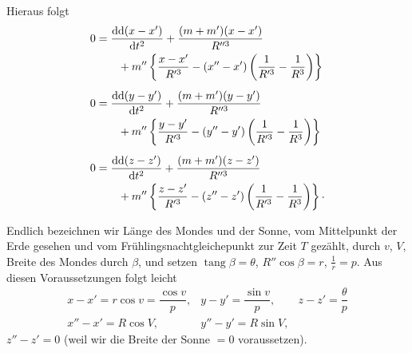 \clearpage
\begingroup
{}
\renewcommand{\headrulewidth}{0pt}
\par\noindent Hieraus folgt
\[
\begin{aligned}
0&=\frac{\mathrm{dd}(x-x')}{\mathrm{d}t^2}
  +\frac{(m+m')(x-x')}{R''^3}\\
 &\qquad+m''\left\{\frac{x-x'}{R'^3}
  -(x''-x')\left(\frac{1}{R'^3}-\frac{1}{R^3}\right)\right\}\\[5pt]
0&=\frac{\mathrm{dd}(y-y')}{\mathrm{d}t^2}
  +\frac{(m+m')(y-y')}{R''^3}\\
 &\qquad+m''\left\{\frac{y-y'}{R'^3}
  -(y''-y')\left(\frac{1}{R'^3}-\frac{1}{R^3}\right)\right\}\\[5pt]
0&=\frac{\mathrm{dd}(z-z')}{\mathrm{d}t^2}
  +\frac{(m+m')(z-z')}{R''^3}\\
 &\qquad+m''\left\{\frac{z-z'}{R'^3}
  -(z''-z')\left(\frac{1}{R'^3}-\frac{1}{R^3}\right)\right\}
  \mathpunct{\raisebox{.4ex}{.}}
\end{aligned}
\]

\par\noindent\hspace*{\parindent}Endlich bezeichnen wir Länge des Mondes und der Sonne, vom Mittelpunkt
der Erde gesehen und vom Frühlingsnachtgleichepunkt zur Zeit \(T\)
gezählt, durch \(v\), \(V\), Breite des Mondes durch \(\beta\), und setzen
\(\operatorname{tang}\beta=\theta\), \(R''\cos\beta=r\), \(\frac{1}{r}=p\). Aus
diesen Voraussetzungen folgt leicht
\[
\begin{array}{lll}
x-x'=r\cos v=\dfrac{\cos v}{p},&
y-y'=\dfrac{\sin v}{p},&z-z'=\dfrac{\theta}{p}\\[5pt]
x''-x'=R\cos V,&y''-y'=R\sin V,&
\end{array}
\]
\noindent\(z''-z'=0\) (weil wir die Breite der Sonne \(=0\) voraussetzen).

